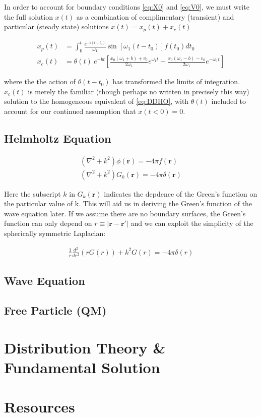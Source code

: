 \documentclass[11pt]{article}
\theoremstyle{plain}
\theoremstyle{definition}
\renewcommand{\vec}[1]{\mathbf{#1}} %
\begin{document}
In order to account for boundary conditions \eqref{eq:X0} and \eqref{eq:V0}, we must write the full solution $x(t)$ as a combination of complimentary (transient) and particular (steady state) solutions $x(t) = x_p(t) + x_c(t)$

\begin{align}
    x_p(t) &= \int_{0}^{t} \frac{e^{-b\left( t-t_0 \right)}}{\omega_1}\sin\left[ \omega_1 \left( t-t_0 \right) \right] f(t_0) dt_0 \\
    x_c(t) &=\theta(t) \  e^{-bt}\left[ \frac{x_0\left( \omega_1+b \right)+v_0  }{2\omega_1}e^{\omega_1 t} + \frac{x_0\left( \omega_1-b \right)-v_0  }{2\omega_1}e^{-\omega_1 t} \right]
\end{align}

where the the action of $\theta(t-t_0)$ has transformed the limits of integration. $x_c(t)$ is merely the familiar (though perhaps no written in precisely this way) solution to the homogeneous equivalent of \eqref{eq:DDHO}, with $\theta(t)$ included to account for our continued assumption that $x(t<0) = 0$.



\subsection{Helmholtz Equation}

\begin{align}
\left( \nabla^2+k^2 \right)\phi(\vec r) = -4\pi f(\vec r) \\
\left( \nabla^2+k^2 \right)G_k(\vec r) = -4\pi \delta(\vec r)
\end{align}

Here the subscript $k$ in $G_k(\vec r)$ indicates the depdence of the Green's function on the particular value of k. This will aid us in deriving the Green's function of the wave equation later. If we assume there are no boundary surfaces, the Green's function can only depend on $r \equiv |\vec r - \vec r'|$ and we can exploit the simplicity of the spherically symmetric Laplacian:

\begin{align}
    \frac{1}{r} \frac{d^2}{dr^2} \left( rG(r) \right) + k^2 G(r) = -4\pi \delta(r)
\end{align}





\subsection{Wave Equation}
\subsection{Free Particle (QM)}

\section{Distribution Theory \& Fundamental Solution}
\section{Resources}
\end{document}
